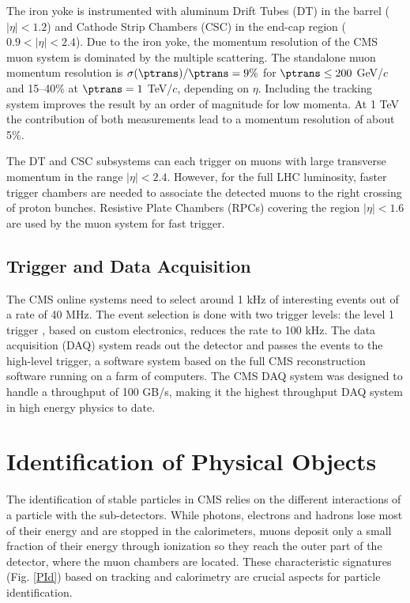 The iron yoke is instrumented with aluminum Drift Tubes (DT) in the barrel ($|\eta| < 1.2$) and Cathode Strip Chambers (CSC) in the end-cap region ($0.9<|\eta|<2.4$). Due to the iron yoke, the momentum resolution of the CMS muon system is dominated by the multiple scattering. The standalone muon momentum resolution is $\sigma(\ptrans)/\ptrans=9\%$ for $\ptrans\le 200$ GeV/$c$ and 15--40\% at $\ptrans=1$ TeV/$c$, depending on $\eta$. Including the tracking system improves the result by an order of magnitude for low momenta. At 1 TeV the contribution of both measurements lead to a momentum resolution of about 5\%. 

The DT and CSC subsystems can each trigger on muons with large transverse momentum in the range $|\eta|<2.4$. However, for the full LHC luminosity, faster trigger chambers are needed to associate the detected muons to the right crossing of proton bunches. Resistive Plate Chambers (RPCs) covering the region $|\eta|<1.6$ are used by the muon system for fast trigger.

\subsection{Trigger and Data Acquisition}
The CMS online systems need to select around 1 kHz of interesting events out of a rate of 40 MHz. The event selection is done with two trigger levels: the level 1 trigger \cite{Dasu:2000ge}, based on custom electronics, reduces the rate to 100 kHz. The data acquisition (DAQ) system \cite{Sphicas:2002gg, Bawej:2015tmz} reads out the detector and passes the events to the high-level trigger, a software system based on the full CMS reconstruction software running on a farm of computers. The CMS DAQ system was designed to handle a throughput of 100 GB/s, making it the highest throughput DAQ system in high energy physics to date.

\section{Identification of Physical Objects}
The identification of stable particles in CMS relies on the different interactions of a particle with the sub-detectors. While photons, electrons and hadrons lose most of their energy and are stopped in the calorimeters, muons deposit only a small fraction of their energy through ionization so they reach the outer part of the detector, where the muon chambers are located. These characteristic signatures (Fig. \ref{PId}) based on tracking and calorimetry are crucial aspects for particle identification.

